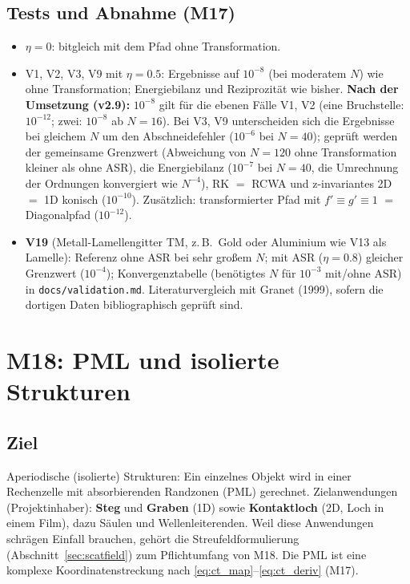 \subsection{Tests und Abnahme (M17)}
\begin{itemize}[nosep]
  \item $\eta=0$: bitgleich mit dem Pfad ohne Transformation.
  \item V1, V2, V3, V9 mit $\eta=0.5$: Ergebnisse auf $10^{-8}$ (bei moderatem $N$) wie ohne Transformation;
        Energiebilanz und Reziprozität wie bisher. \textbf{Nach der Umsetzung (v2.9):} $10^{-8}$ gilt für die ebenen Fälle
        V1, V2 (eine Bruchstelle: $10^{-12}$; zwei: $10^{-8}$ ab $N=16$). Bei V3, V9 unterscheiden sich die Ergebnisse bei
        gleichem $N$ um den Abschneidefehler ($10^{-6}$ bei $N=40$); geprüft werden der gemeinsame Grenzwert (Abweichung
        von $N=120$ ohne Transformation kleiner als ohne ASR), die Energiebilanz ($10^{-7}$ bei $N=40$, die Umrechnung der
        Ordnungen konvergiert wie $N^{-4}$), RK $=$ RCWA und z-invariantes 2D $=$ 1D konisch ($10^{-10}$). Zusätzlich:
        transformierter Pfad mit $f'\equiv g'\equiv1$ $=$ Diagonalpfad ($10^{-12}$).
  \item \textbf{V19} (Metall-Lamellengitter TM, z.\,B.\ Gold oder Aluminium wie V13 als Lamelle): Referenz ohne ASR bei sehr
        großem $N$; mit ASR ($\eta=0.8$) gleicher Grenzwert ($10^{-4}$); Konvergenztabelle (benötigtes $N$ für $10^{-3}$
        mit/ohne ASR) in \verb|docs/validation.md|. Literaturvergleich mit Granet (1999), sofern die dortigen Daten
        bibliographisch geprüft sind.
\end{itemize}

\section{M18: PML und isolierte Strukturen}\label{sec:pml}

\subsection{Ziel}
Aperiodische (isolierte) Strukturen: Ein einzelnes Objekt wird in einer Rechenzelle mit absorbierenden Randzonen (PML)
gerechnet. Zielanwendungen (Projektinhaber): \textbf{Steg} und \textbf{Graben} (1D) sowie \textbf{Kontaktloch} (2D, Loch
in einem Film), dazu Säulen und Wellenleiterenden. Weil diese Anwendungen schrägen Einfall brauchen, gehört die
Streufeldformulierung (Abschnitt~\ref{sec:scatfield}) zum Pflichtumfang von M18. Die PML ist eine komplexe Koordinatenstreckung nach
\eqref{eq:ct_map}--\eqref{eq:ct_deriv} (M17).

